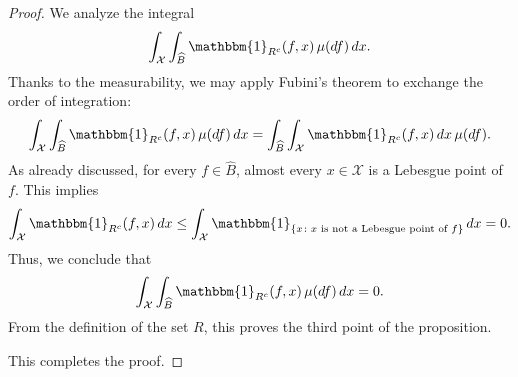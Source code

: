 \documentclass[a4paper, 11pt]{article}
\theoremstyle{definition}
\newcommand{\cX}{{\mathcal{X}}}
\begin{document}
{\begin{proof}
	We analyze the integral
	\[
	\int_{\cX} \int_{\widehat{B}} \mathbbm{1}_{R^c}(f,x) \, \mu(df) \, dx.
	\]
	Thanks to the measurability,  we may apply Fubini’s theorem to exchange the order of integration:
	\[
	\int_{\cX} \int_{\widehat{B}} \mathbbm{1}_{R^c}(f,x) \, \mu(df) \, dx = \int_{\widehat{B}} \int_{\cX} \mathbbm{1}_{R^c}(f,x) \, dx \, \mu(df).
	\]
	As already discussed, for every \( f \in \widehat{B} \), almost every \( x \in \cX  \) is a Lebesgue point of \( f \). This implies
	\[
	\int_{\cX} \mathbbm{1}_{R^c}(f,x) \, dx \le \int_{\cX} \mathbbm{1}_{\{x \colon x \text{ is not a Lebesgue point of } f\}} \, dx = 0.
	\]
	Thus, we conclude that
	\[
	\int_{\cX} \int_{\widehat{B}}\mathbbm{1}_{R^c}(f,x) \, \mu(df) \, dx = 0.
	\]
	From the definition of the set $R$, this proves the third point of the proposition.
%	
%	
%	
	\medskip
	
	\noindent This completes the proof.
	
\end{proof}




}
\end{document}
